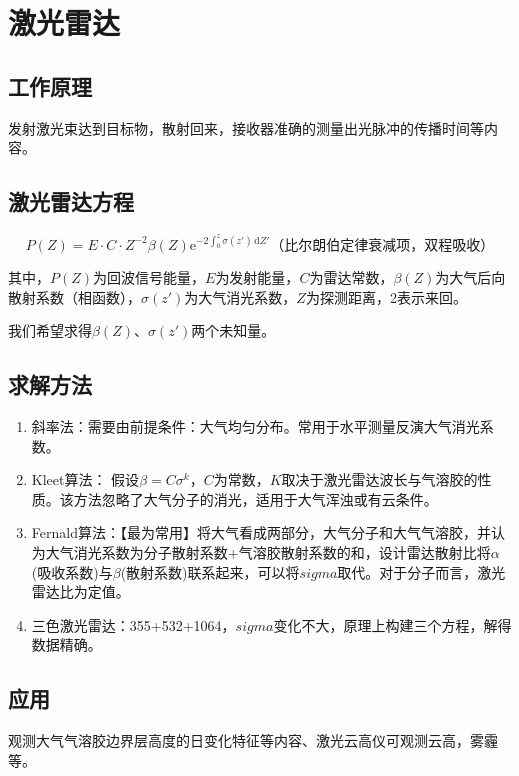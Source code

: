 \documentclass[UTF8,11pt]{ctexbook}
\begin{document}
\chapter{激光雷达}

\section{工作原理}

发射激光束达到目标物，散射回来，接收器准确的测量出光脉冲的传播时间等内容。

\section{激光雷达方程}
\[
P(Z)=E\cdot C\cdot Z^{-2}\beta(Z)\mathrm{e}^{-2\int_0^z\sigma(z')\,\mathrm{d}Z'}\text{（比尔朗伯定律衰减项，双程吸收）}
\]

其中，\(P(Z)\)为回波信号能量，\(E\)为发射能量，\(C\)为雷达常数，\(\beta(Z)\)为大气后向散射系数（相函数），\(\sigma(z')\)为大气消光系数，\(Z\)为探测距离，2表示来回。

我们希望求得\(\beta(Z)\)、\(\sigma(z')\)两个未知量。

\section{求解方法}
\begin{enumerate}
    \item 斜率法：需要由前提条件：大气均匀分布。常用于水平测量反演大气消光系数。
    \item Kleet算法： 假设\(\beta=C\sigma^k\)，\(C\)为常数，\(K\)取决于激光雷达波长与气溶胶的性质。该方法忽略了大气分子的消光，适用于大气浑浊或有云条件。
    \item Fernald算法：【最为常用】将大气看成两部分，大气分子和大气气溶胶，并认为大气消光系数为分子散射系数+气溶胶散射系数的和，设计雷达散射比将\(\alpha\)(吸收系数)与\(\beta\)(散射系数)联系起来，可以将\(sigma\)取代。对于分子而言，激光雷达比为定值。
    \item 三色激光雷达：355+532+1064，\(sigma\)变化不大，原理上构建三个方程，解得数据精确。
\end{enumerate}

\section{应用}

观测大气气溶胶边界层高度的日变化特征等内容、激光云高仪可观测云高，雾霾等。
\end{document}
